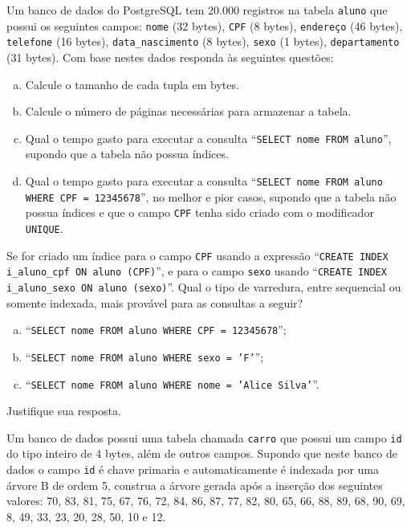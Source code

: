 \exercise Um banco de dados do PostgreSQL tem 20.000 registros na
tabela {\tt aluno} que possui os seguintes campos: {\tt nome} (32
bytes), {\tt CPF} (8 bytes), {\tt endereço} (46 bytes), {\tt telefone}
(16 bytes), {\tt data\_nascimento} (8 bytes), {\tt sexo} (1 bytes),
{\tt departamento} (31 bytes). Com base nestes dados responda às
seguintes questões:
\begin{enumerate}[a)]
\item Calcule o tamanho de cada tupla em bytes.
\item Calcule o número de páginas necessárias para armazenar a tabela.
\item Qual o tempo gasto para executar a consulta ``{\tt SELECT nome
    FROM aluno}'', supondo que a tabela não possua índices.
\item Qual o tempo gasto para executar a consulta ``{\tt SELECT nome
    FROM aluno WHERE CPF = 12345678}'', no melhor e pior casos,
  supondo que a tabela não possua índices e que o campo {\tt CPF}
  tenha sido criado com o modificador {\tt UNIQUE}.
\end{enumerate}

\exercise Se for criado um índice para o campo {\tt CPF} usando a
expressão ``{\tt CREATE INDEX i\_aluno\_cpf ON aluno (CPF)}'', e para o
campo {\tt sexo} usando ``{\tt CREATE INDEX i\_aluno\_sexo ON aluno
  (sexo)}''. Qual o tipo de varredura, entre sequencial ou somente
indexada, mais provável para as consultas a seguir?
\begin{enumerate}[a)]
\item ``{\tt SELECT nome FROM aluno WHERE CPF = 12345678}'';
\item ``{\tt SELECT nome FROM aluno WHERE sexo = 'F'}'';
\item ``{\tt SELECT nome FROM aluno WHERE nome = 'Alice Silva'}''.
\end{enumerate}
\noindent Justifique sua resposta. \par

\exercise Um banco de dados possui uma tabela chamada {\tt carro} que
possui um campo {\tt id} do tipo inteiro de 4 bytes, além de outros
campos. Supondo que neste banco de dados o campo {\tt id} é chave
primaria e automaticamente é indexada por uma árvore B de ordem 5,
construa a árvore gerada após a inserção dos seguintes valores: 70,
83, 81, 75, 67, 76, 72, 84, 86, 87, 77, 82, 80, 65, 66, 88, 89, 68,
90, 69, 8, 49, 33, 23, 20, 28, 50, 10 e 12. \par

